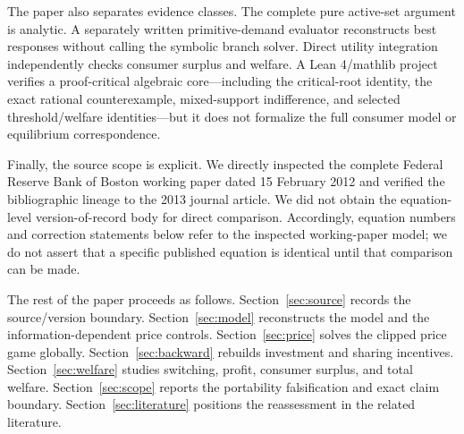 The paper also separates evidence classes. The complete pure active-set argument is analytic. A separately written primitive-demand evaluator reconstructs best responses without calling the symbolic branch solver. Direct utility integration independently checks consumer surplus and welfare. A Lean 4/mathlib project verifies a proof-critical algebraic core---including the critical-root identity, the exact rational counterexample, mixed-support indifference, and selected threshold/welfare identities---but it does not formalize the full consumer model or equilibrium correspondence.

Finally, the source scope is explicit. We directly inspected the complete Federal Reserve Bank of Boston working paper dated 15 February 2012 and verified the bibliographic lineage to the 2013 journal article. We did not obtain the equation-level version-of-record body for direct comparison. Accordingly, equation numbers and correction statements below refer to the inspected working-paper model; we do not assert that a specific published equation is identical until that comparison can be made.

The rest of the paper proceeds as follows. Section~\ref{sec:source} records the source/version boundary. Section~\ref{sec:model} reconstructs the model and the information-dependent price controls. Section~\ref{sec:price} solves the clipped price game globally. Section~\ref{sec:backward} rebuilds investment and sharing incentives. Section~\ref{sec:welfare} studies switching, profit, consumer surplus, and total welfare. Section~\ref{sec:scope} reports the portability falsification and exact claim boundary. Section~\ref{sec:literature} positions the reassessment in the related literature.
